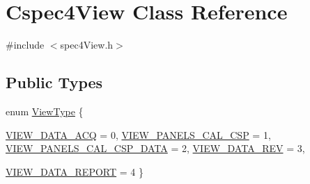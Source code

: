 \hypertarget{classCspec4View}{
\section{Cspec4View Class Reference}
\label{classCspec4View}
}


{\ttfamily \#include $<$spec4View.h$>$}

\subsection*{Public Types}
\begin{DoxyCompactItemize}
\item 
enum \hyperlink{classCspec4View_aaf674304b3fe5925f399bb679c0a2212}{ViewType} \{ \par
\hyperlink{classCspec4View_aaf674304b3fe5925f399bb679c0a2212a9bdca882f572bbefc9fc96cca21b9485}{VIEW\_\-DATA\_\-ACQ} =  0, 
\hyperlink{classCspec4View_aaf674304b3fe5925f399bb679c0a2212a60b752be756e16c25460fd0fabb61e5c}{VIEW\_\-PANELS\_\-CAL\_\-CSP} =  1, 
\hyperlink{classCspec4View_aaf674304b3fe5925f399bb679c0a2212a71a1c7a4f19cec7f6adb99263c2431f0}{VIEW\_\-PANELS\_\-CAL\_\-CSP\_\-DATA} =  2, 
\hyperlink{classCspec4View_aaf674304b3fe5925f399bb679c0a2212acf010d2582f579711fa94ff3ba8db01e}{VIEW\_\-DATA\_\-REV} =  3, 
\par
\hyperlink{classCspec4View_aaf674304b3fe5925f399bb679c0a2212ab449d410fe4c65311809a941cdcf4feb}{VIEW\_\-DATA\_\-REPORT} =  4
 \}
\end{DoxyCompactItemize}
